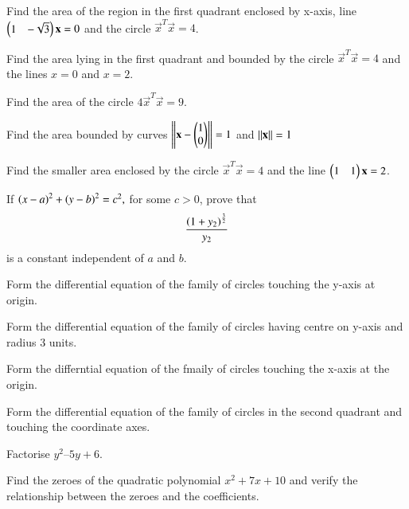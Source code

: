 \item  Find the area of the region in the first quadrant enclosed by x-axis, line $\begin{pmatrix}1 & -\sqrt{3}\end{pmatrix}\mathbf{x} =0$ and the circle $\vec{x}^T\vec{x}=4$.
%
\item Find the area lying in the first quadrant and bounded by the circle $\vec{x}^T\vec{x}=4$ and the lines $x = 0$ and $x = 2$.
%
\\
\solution

\item Find the area of the circle $4\vec{x}^T\vec{x}=9$.
\item  Find the area bounded by curves $\left\lVert\mathbf{x}-\begin{pmatrix}1\\0\end{pmatrix}\right\rVert = 1$ and $\left\lVert\mathbf{x}\right\rVert=1$
\item Find the smaller area enclosed by the circle $\vec{x}^T\vec{x}=4$ and the line $\begin{pmatrix}1 & 1\end{pmatrix}\mathbf{x} = 2$.
%
\item If 
$
\left(x-a\right)^2+\left(y-b\right)^2 = c^2,
$
for some $c > 0$, prove that 
\begin{align}
\frac{\left(1+y_2\right)^\frac{3}{2}}{y_2}
\end{align}
%
is a constant independent of $a$ and $b$.
%
\item Form the differential equation of the family of circles touching the y-axis at origin.
\item Form the differential equation of the family of circles having centre on y-axis and radius 3 units.
\item Form the differntial equation of the fmaily of circles touching the x-axis at the origin.
%
\item Form the differential equation of the family of circles in the second quadrant and touching the coordinate axes.
\item Factorise $y^2 – 5y + 6$.
\item Find the zeroes of the quadratic polynomial $x^2+7x+10$ and verify the relationship between the zeroes and the coefficients.


